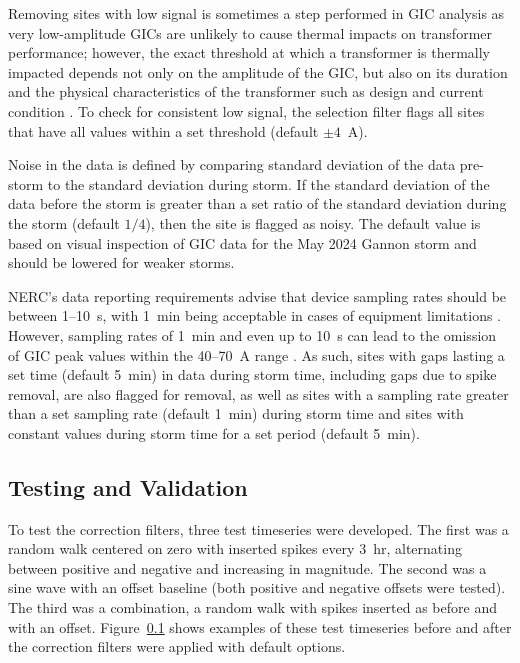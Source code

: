 \documentclass[draft]{agujournal2019}
\begin{document}
Removing sites with low signal is sometimes a step performed in GIC analysis as very low-amplitude GICs are unlikely to cause thermal impacts on transformer performance; however, the exact threshold at which a transformer is thermally impacted depends not only on the amplitude of the GIC, but also on its duration and the physical characteristics of the transformer such as design and current condition \cite{NERC2017}. 
To check for consistent low signal, the selection filter flags all sites that have all values within a set threshold (default $\pm4$~A). 

Noise in the data is defined by comparing standard deviation of the data pre-storm to the standard deviation during storm. If the standard deviation of the data before the storm is greater than a set ratio of the standard deviation during the storm (default $1/4$), then the site is flagged as noisy. The default value is based on visual inspection of GIC data for the May 2024 Gannon storm and should be lowered for weaker storms.

NERC's data reporting requirements advise that device sampling rates should be between 1--10~s, with 1~min being acceptable in cases of equipment limitations \cite{NERC2026_reporting}. However, sampling rates of 1~min and even up to 10~s can lead to the omission of GIC peak values within the 40--70~A range \cite{Trichtchenko2021}. As such, sites with gaps lasting a set time (default 5~min) in data during storm time, including gaps due to spike removal, are also flagged for removal, as well as sites with a sampling rate greater than a set sampling rate (default 1~min) during storm time and sites with constant values during storm time for a set period (default 5~min).

\subsection{Testing and Validation}

To test the correction filters, three test timeseries were developed. The first was a random walk centered on zero with inserted spikes every 3~hr, alternating between positive and negative and increasing in magnitude. The second was a sine wave with an offset baseline (both positive and negative offsets were tested). The third was a combination, a random walk with spikes inserted as before and with an offset. Figure~\ref{} shows examples of these test timeseries before and after the correction filters were applied with default options.
\end{document}
